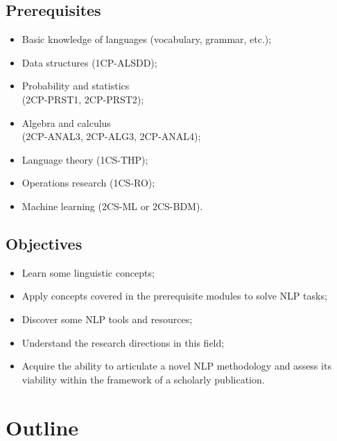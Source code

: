 \documentclass[11pt, a4paper]{article}
\begin{document}
\begin{minipage}{0.44\textwidth}
		
	\subsection{Prerequisites}
	
	\begin{itemize}
		\item Basic knowledge of languages (vocabulary, grammar, etc.);
		\item Data structures (1CP-ALSDD);
		\item Probability and statistics \\(2CP-PRST1, 2CP-PRST2);
		\item Algebra and calculus \\(2CP-ANAL3, 2CP-ALG3, 2CP-ANAL4);
		\item Language theory (1CS-THP);
		\item Operations research (1CS-RO);
		\item Machine learning (2CS-ML or 2CS-BDM).
	\end{itemize}

\end{minipage}
\begin{minipage}{0.05\textwidth}
	\hspace{2pt}
\end{minipage}
\begin{minipage}{0.49\textwidth}
	\subsection{Objectives}
	
	\begin{itemize}
		\item Learn some linguistic concepts;
		\item Apply concepts covered in the prerequisite modules to solve NLP tasks;
		\item Discover some NLP tools and resources;
		\item Understand the research directions in this field;
		\item Acquire the ability to articulate a novel NLP methodology and assess its viability within the framework of a scholarly publication.
	\end{itemize}
	
\end{minipage}

\section{Outline}
\end{document}
